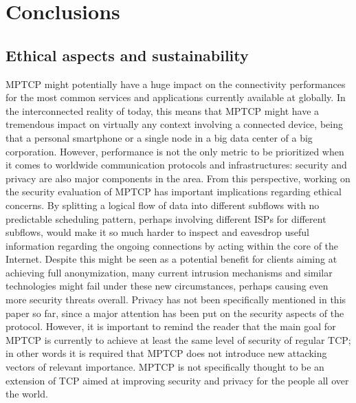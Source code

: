 \chapter{Conclusions}
\label{chap:conclusions}

\section{Ethical aspects and sustainability}
MPTCP might potentially have a huge impact on the connectivity performances for the most common services and applications currently available at globally. In the interconnected reality of today, this means that MPTCP might have a tremendous impact on virtually any context involving a connected device, being that a personal smartphone or a single node in a big data center of a big corporation. 
However, performance is not the only metric to be prioritized when it comes to worldwide communication protocols and infrastructures: security and privacy are also major components in the area. From this perspective, working on the security evaluation of MPTCP has important implications regarding ethical concerns.
By splitting a logical flow of data into different subflows with no predictable scheduling pattern, perhaps involving different ISPs for different subflows, would make it so much harder to inspect and eavesdrop useful information regarding the ongoing connections by acting within the core of the Internet. Despite this might be seen as a potential benefit for clients aiming at achieving full anonymization, many current intrusion mechanisms and similar technologies might fail under these new circumstances, perhaps causing even more security threats overall.
Privacy has not been specifically mentioned in this paper so far, since a major attention has been put on the security aspects of the protocol. However, it is important to remind the reader that the main goal for MPTCP is currently to achieve at least the same level of security of regular TCP; in other words it is required that MPTCP does not introduce new attacking vectors of relevant importance. MPTCP is not specifically thought to be an extension of TCP aimed at improving security and privacy for the people all over the world.

